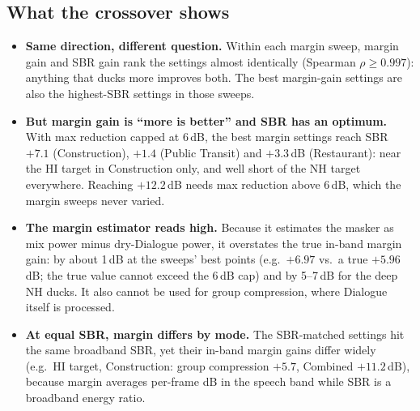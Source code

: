 \documentclass[11pt]{article}
\begin{document}
\subsection*{What the crossover shows}
\begin{itemize}[nosep]
\item \textbf{Same direction, different question.} Within each margin sweep, margin gain and SBR gain rank the settings
almost identically (Spearman $\rho \geq 0.997$): anything that ducks more improves both. The best margin-gain settings are
also the highest-SBR settings in those sweeps.
\item \textbf{But margin gain is ``more is better'' and SBR has an optimum.} With max reduction capped at 6\,dB, the
best margin settings reach SBR $+7.1$ (Construction), $+1.4$ (Public Transit) and $+3.3$\,dB (Restaurant): near the HI
target in Construction only, and well short of the NH target everywhere. Reaching $+12.2$\,dB needs max reduction
above 6\,dB, which the margin sweeps never varied.
\item \textbf{The margin estimator reads high.} Because it estimates the masker as mix power minus dry-Dialogue power,
it overstates the true in-band margin gain: by about 1\,dB at the sweeps' best points (e.g.\ $+6.97$ vs.\ a true
$+5.96$\,dB; the true value cannot exceed the 6\,dB cap) and by 5--7\,dB for the deep NH ducks. It also cannot be used
for group compression, where Dialogue itself is processed.
\item \textbf{At equal SBR, margin differs by mode.} The SBR-matched settings hit the same broadband SBR, yet their
in-band margin gains differ widely (e.g.\ HI target, Construction: group compression $+5.7$, Combined $+11.2$\,dB),
because margin averages per-frame dB in the speech band while SBR is a broadband energy ratio.
\end{itemize}
\end{document}
